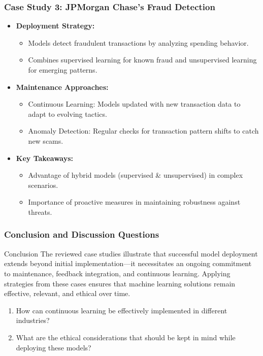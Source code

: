 \documentclass[aspectratio=169]{beamer}
\begin{document}
\begin{frame}[fragile]
    \frametitle{Case Study 3: JPMorgan Chase's Fraud Detection}
    \begin{itemize}
        \item \textbf{Deployment Strategy:}
            \begin{itemize}
                \item Models detect fraudulent transactions by analyzing spending behavior.
                \item Combines supervised learning for known fraud and unsupervised learning for emerging patterns.
            \end{itemize}
        \item \textbf{Maintenance Approaches:}
            \begin{itemize}
                \item Continuous Learning: Models updated with new transaction data to adapt to evolving tactics.
                \item Anomaly Detection: Regular checks for transaction pattern shifts to catch new scams.
            \end{itemize}
        \item \textbf{Key Takeaways:}
            \begin{itemize}
                \item Advantage of hybrid models (supervised \& unsupervised) in complex scenarios.
                \item Importance of proactive measures in maintaining robustness against threats.
            \end{itemize}
    \end{itemize}
\end{frame}

\begin{frame}[fragile]
    \frametitle{Conclusion and Discussion Questions}
    \begin{block}{Conclusion}
        The reviewed case studies illustrate that successful model deployment extends beyond initial implementation—it necessitates an ongoing commitment to maintenance, feedback integration, and continuous learning. 
        Applying strategies from these cases ensures that machine learning solutions remain effective, relevant, and ethical over time.
    \end{block}
    
    \begin{enumerate}
        \item How can continuous learning be effectively implemented in different industries?
        \item What are the ethical considerations that should be kept in mind while deploying these models?
    \end{enumerate}
\end{frame}
\end{document}
